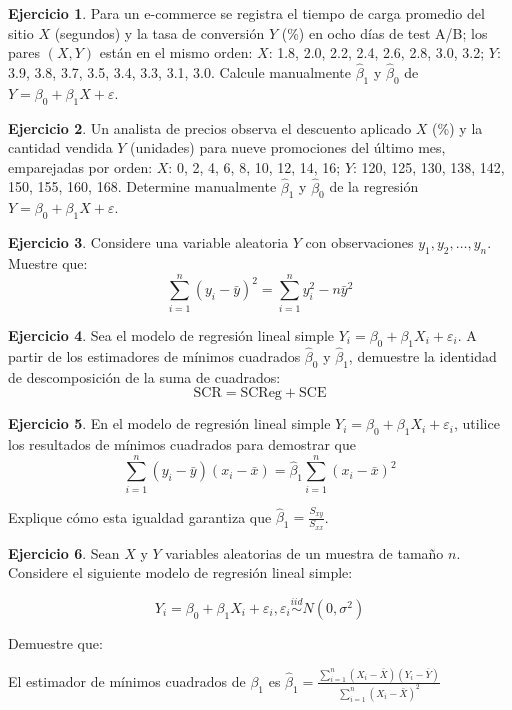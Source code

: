 \documentclass[
  11pt,
]{book}
\theoremstyle{definition}
\theoremstyle{definition}
\theoremstyle{definition}
\newtheorem{exercise}{Ejercicio}[chapter]
\theoremstyle{definition}
\theoremstyle{remark}
\begin{document}
\begin{exercise}
Para un e-commerce se registra el tiempo de carga promedio del sitio \(X\) (segundos) y la tasa de conversión \(Y\) (\%) en ocho días de test A/B; los pares \((X,Y)\) están en el mismo orden: \(X\): 1.8, 2.0, 2.2, 2.4, 2.6, 2.8, 3.0, 3.2; \(Y\): 3.9, 3.8, 3.7, 3.5, 3.4, 3.3, 3.1, 3.0. Calcule manualmente \(\hat\beta_1\) y \(\hat\beta_0\) de \(Y=\beta_0+\beta_1 X+\varepsilon\).
\end{exercise}

\begin{exercise}
Un analista de precios observa el descuento aplicado \(X\) (\%) y la cantidad vendida \(Y\) (unidades) para nueve promociones del último mes, emparejadas por orden: \(X\): 0, 2, 4, 6, 8, 10, 12, 14, 16; \(Y\): 120, 125, 130, 138, 142, 150, 155, 160, 168. Determine manualmente \(\hat\beta_1\) y \(\hat\beta_0\) de la regresión \(Y=\beta_0+\beta_1 X+\varepsilon\).
\end{exercise}

\begin{exercise}
Considere una variable aleatoria \(Y\) con observaciones \(y_1, y_2, \ldots, y_n\). Muestre que:
\[
\sum_{i=1}^n (y_i - \bar{y})^2 = \sum_{i=1}^n y_i^2 - n \bar{y}^2
\]
\end{exercise}

\begin{exercise}
Sea el modelo de regresión lineal simple \(Y_i = \beta_0 + \beta_1 X_i + \varepsilon_i\). A partir de los estimadores de mínimos cuadrados \(\hat\beta_0\) y \(\hat\beta_1\), demuestre la identidad de descomposición de la suma de cuadrados:
\[
\text{SCR} = \text{SCReg} + \text{SCE}
\]
\end{exercise}

\begin{exercise}
En el modelo de regresión lineal simple \(Y_i = \beta_0 + \beta_1 X_i + \varepsilon_i\), utilice los resultados de mínimos cuadrados para demostrar que
\[
\sum_{i=1}^n (y_i - \bar{y})(x_i - \bar{x}) = \hat\beta_1 \sum_{i=1}^n (x_i - \bar{x})^2
\]

Explique cómo esta igualdad garantiza que \(\hat\beta_1 = \frac{S_{xy}}{S_{xx}}\).
\end{exercise}

\begin{exercise}
Sean \(X\) y \(Y\) variables aleatorias de un muestra de tamaño \(n\). Considere el siguiente modelo de regresión lineal simple:

\[
Y_i = \beta_0 + \beta_1X_i + \varepsilon_i, \varepsilon_i \overset{iid}{\sim} N(0, \sigma^2)
\]

Demuestre que:

El estimador de mínimos cuadrados de \(\beta_1\) es \(\hat{\beta}_1 = \displaystyle\frac{\displaystyle\sum_{i=1}^n(X_i - \bar{X})(Y_i - \bar{Y})}{\displaystyle\sum_{i=1}^n(X_i - \bar{X})^2}\)
\end{exercise}
\end{document}
